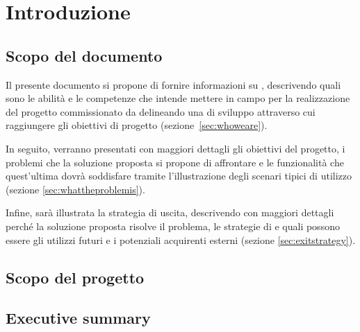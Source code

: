 \newcommand{\sharedPath}{../shared}
\newcommand{\doctitle}{Business Plan}








\section{Introduzione}
\subsection{Scopo del documento}
Il presente documento si propone di fornire informazioni su \team, descrivendo quali sono le abilità e le competenze che intende mettere in campo per la realizzazione del progetto commissionato da \customer delineando una  di sviluppo attraverso cui raggiungere gli obiettivi di progetto (sezione~\ref{sec:whoweare}).

In seguito, verranno presentati con maggiori dettagli gli obiettivi del progetto, i problemi che la soluzione proposta si propone di affrontare e le funzionalità che quest'ultima dovrà soddisfare tramite l'illustrazione degli scenari tipici di utilizzo (sezione \ref{sec:whattheproblemis}).
 
Infine, sarà illustrata la strategia di uscita, descrivendo con maggiori dettagli perché la soluzione proposta risolve il problema, le strategie di \mktg e quali possono essere gli utilizzi futuri e i potenziali acquirenti esterni (sezione \ref{sec:exitstrategy}).

\subsection{Scopo del progetto}

\subsection{Executive summary}

